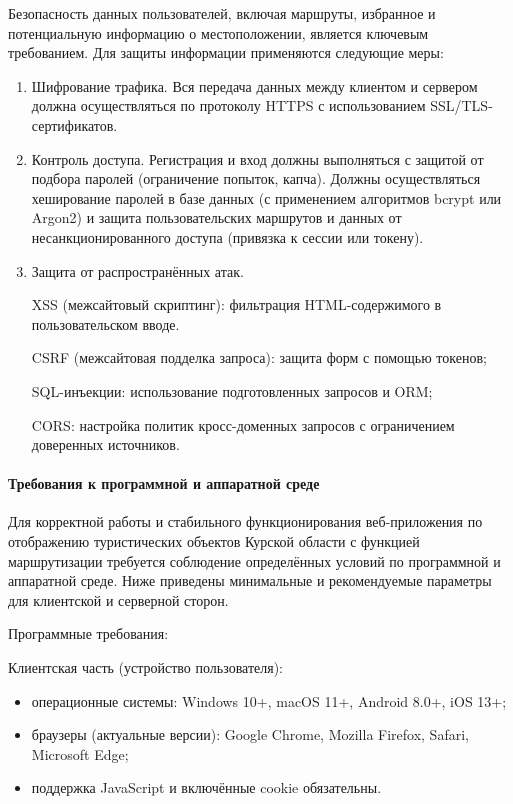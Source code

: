 Безопасность данных пользователей, включая маршруты, избранное и потенциальную информацию о местоположении, является ключевым требованием. Для защиты информации применяются следующие меры:
\begin{enumerate}
	\item Шифрование трафика. Вся передача данных между клиентом и сервером должна осуществляться по протоколу HTTPS с использованием SSL/TLS-сертификатов.
	\item Контроль доступа. Регистрация и вход должны выполняться с защитой от подбора паролей (ограничение попыток, капча). Должны осуществляться хеширование паролей в базе данных (с применением алгоритмов bcrypt или Argon2) и защита пользовательских маршрутов и данных от несанкционированного доступа (привязка к сессии или токену).
	\item Защита от распространённых атак. 
	
	XSS (межсайтовый скриптинг): фильтрация HTML-содержимого в пользовательском вводе.
	
	CSRF (межсайтовая подделка запроса): защита форм с помощью токенов;
	
	SQL-инъекции: использование подготовленных запросов и ORM;
	
	CORS: настройка политик кросс-доменных запросов с ограничением доверенных источников.
\end{enumerate}

\paragraph{Требования к программной и аппаратной среде}

Для корректной работы и стабильного функционирования веб-приложения по отображению туристических объектов Курской области с функцией маршрутизации требуется соблюдение определённых условий по программной и аппаратной среде. Ниже приведены минимальные и рекомендуемые параметры для клиентской и серверной сторон.

Программные требования:

Клиентская часть (устройство пользователя):
\begin{itemize}
	\item операционные системы: Windows 10+, macOS 11+, Android 8.0+, iOS 13+;
	\item браузеры (актуальные версии): Google Chrome, Mozilla Firefox, Safari, Microsoft Edge;
	\item поддержка JavaScript и включённые cookie обязательны.
\end{itemize}

